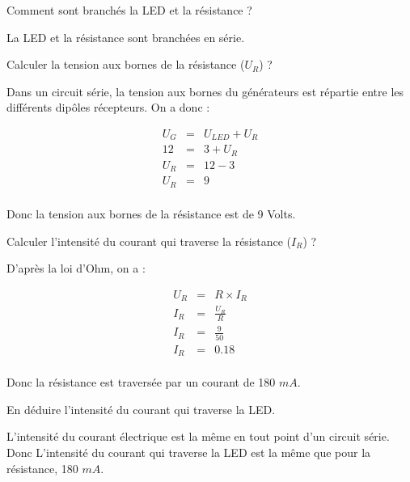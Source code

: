 \begin{questions}
	\question[1] Comment sont branchés la LED et la résistance ?
	\begin{solution}
		La LED et la résistance sont branchées en série.
	\end{solution}
	
	\question[1] Calculer la tension aux bornes de la résistance ($U_R$) ?
	\begin{solution}
		Dans un circuit série, la tension aux bornes du générateurs est répartie entre les différents dipôles récepteurs. On a donc :
		
		\begin{eqnarray*}
			U_G &=& U_{LED} + U_R\\
			12 &=& 3 + U_R\\
			U_R &=& 12 - 3 \\
			U_R &=& 9 \\
		\end{eqnarray*}
	
	Donc la tension aux bornes de la résistance est de 9 Volts.
	\end{solution}
	
	\question[1] Calculer l'intensité du courant qui traverse la résistance ($I_R$) ?
	\begin{solution}
		D'après la loi d'Ohm, on a :
		
		\begin{eqnarray*}
			U_{R} &=& R \times I_{R}\\
			I_{R} &=& \frac{U_{R}}{R} \\
			I_{R} &=& \frac{9}{50} \\
			I_{R} &=& \num{0.18} \\
		\end{eqnarray*}
	
	Donc la résistance est traversée par un courant de 180 $mA$.
	\end{solution}
	
	\question[1] En déduire l'intensité du courant qui traverse la LED.
	\begin{solution}
		L'intensité du courant électrique est la même en tout point d'un circuit série. Donc L'intensité du courant qui traverse la LED est la même que pour la résistance, 180 $mA$.
	\end{solution}
\end{questions}